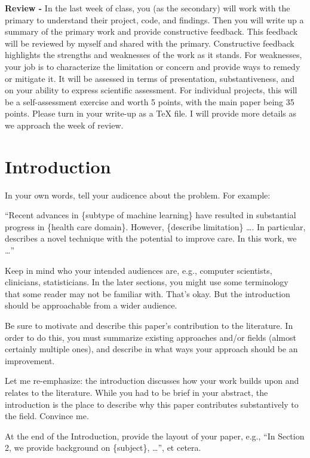 \documentclass[twoside,11pt]{article}
\begin{document}
\textbf{Review -} In the last week of class, you (as the secondary) will work with the primary to understand their project, code, and findings. Then you will write up a summary of the primary work and provide constructive feedback. This feedback will be reviewed by myself and shared with the primary. Constructive feedback highlights the strengths and weaknesses of the work as it stands. For weaknesses, your job is to characterize the limitation or concern and provide ways to remedy or mitigate it. It will be assessed in terms of presentation, substantiveness, and on your ability to express scientific assessment. For individual projects, this will be a self-assessment exercise and worth 5 points, with the main paper being 35 points. Please turn in your write-up as a TeX file. I will provide more details as we approach the week of review.


\section{Introduction}
In your own words, tell your audicence about the problem. For example:

``Recent advances in \{subtype of machine learning\} \citep{cite1} have resulted in substantial progress in \{health care domain\}. However, \{describe limitation\} \dots.
In particular, \citet{cite2} describes a novel technique with the potential to improve care.
In this work, we \dots''

Keep in mind who your intended audiences are, e.g., computer scientists, clinicians, statisticians.
In the later sections, you might use some terminology that some reader may not be familiar with.
That's okay. But the introduction should be approachable from a wider audience.

Be sure to motivate and describe this paper's contribution to the literature.
In order to do this, you must summarize existing approaches and/or fields (almost certainly multiple ones),
and describe in what ways your approach should be an improvement. 

Let me re-emphasize: the introduction discusses how your work builds upon and relates to the literature. While you had to be brief in your abstract, the introduction is the place to describe why this paper contributes substantively to the field. Convince me.

At the end of the Introduction, provide the layout of your paper, e.g., ``In Section 2, we provide background on \{subject\}, \dots'',  et cetera.
\end{document}

